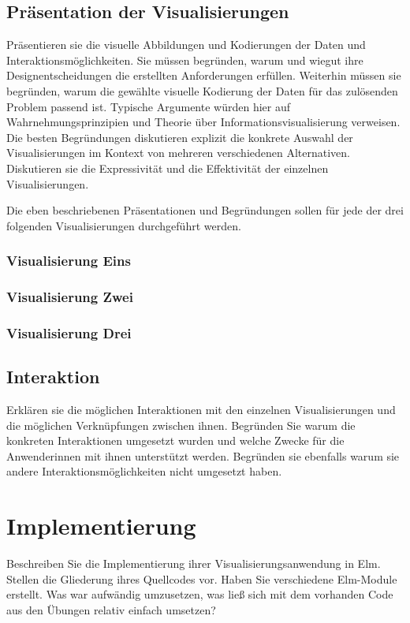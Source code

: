 \documentclass[usegeometry=true]{scrartcl}
\begin{document}
\subsection{Präsentation der Visualisierungen}
Präsentieren sie die visuelle Abbildungen und Kodierungen der Daten und Interaktionsmöglichkeiten. 
Sie müssen  begründen, warum und wiegut ihre Designentscheidungen die erstellten Anforderungen erfüllen. 
Weiterhin müssen sie begründen, warum die gewählte visuelle Kodierung der Daten für das zulösenden Problem passend ist. 
Typische Argumente würden hier auf Wahrnehmungsprinzipien und Theorie über Informationsvisualisierung verweisen. 
Die besten Begründungen diskutieren explizit die konkrete Auswahl der Visualisierungen im Kontext von mehreren verschiedenen Alternativen. Diskutieren sie die Expressivität und die Effektivität der einzelnen Visualisierungen. 

Die eben beschriebenen Präsentationen und Begründungen sollen für jede der drei folgenden Visualisierungen durchgeführt werden. 
\subsubsection{Visualisierung Eins}
\subsubsection{Visualisierung Zwei}
\subsubsection{Visualisierung Drei}

\subsection{Interaktion}
Erklären sie die möglichen Interaktionen mit den einzelnen Visualisierungen und die möglichen Verknüpfungen zwischen ihnen. Begründen Sie warum die konkreten Interaktionen umgesetzt wurden und welche Zwecke für die Anwenderinnen mit ihnen unterstützt werden. Begründen sie ebenfalls warum sie andere Interaktionsmöglichkeiten nicht umgesetzt haben. 

\section{Implementierung}
Beschreiben Sie die Implementierung ihrer Visualisierungsanwendung in Elm. Stellen die Gliederung ihres Quellcodes vor. Haben Sie verschiedene Elm-Module erstellt. Was war aufwändig umzusetzen, was ließ sich mit dem vorhanden Code aus den Übungen relativ einfach umsetzen? 
\end{document}
